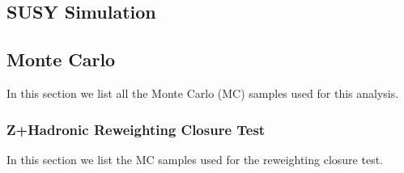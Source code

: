   \subsection{SUSY Simulation} \label{sec:susy_simulation}
  \subsection{Monte Carlo}
    
    In this section we list all the Monte Carlo (MC) samples used for this analysis.

    \subsubsection{Z+Hadronic \pt Reweighting Closure Test}

      In this section we list the MC samples used for the \pt reweighting closure test.
